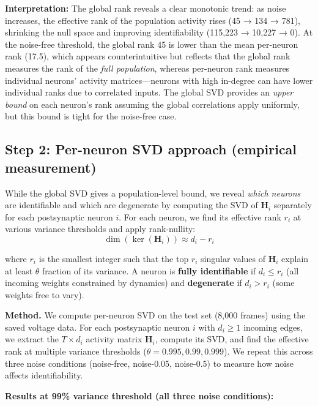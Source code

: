 \documentclass[11pt,a4paper]{article}
\begin{document}
\noindent\textbf{Interpretation:} The global rank reveals a clear monotonic trend: as noise increases, the effective rank of the population activity rises (45 → 134 → 781), shrinking the null space and improving identifiability (115,223 → 10,227 → 0). At the noise-free threshold, the global rank 45 is lower than the mean per-neuron rank (17.5), which appears counterintuitive but reflects that the global rank measures the rank of the \emph{full population}, whereas per-neuron rank measures individual neurons' activity matrices---neurons with high in-degree can have lower individual ranks due to correlated inputs. The global SVD provides an \emph{upper bound} on each neuron's rank assuming the global correlations apply uniformly, but this bound is tight for the noise-free case.

\subsection{Step 2: Per-neuron SVD approach (empirical measurement)}

While the global SVD gives a population-level bound, we reveal \emph{which neurons} are identifiable and which are degenerate by computing the SVD of $\mathbf{H}_i$ separately for each postsynaptic neuron $i$. For each neuron, we find its effective rank $r_i$ at various variance thresholds and apply rank-nullity:
\begin{equation}
\dim(\ker(\mathbf{H}_i)) \approx d_i - r_i
\end{equation}

where $r_i$ is the smallest integer such that the top $r_i$ singular values of $\mathbf{H}_i$ explain at least $\theta$ fraction of its variance. A neuron is \textbf{fully identifiable} if $d_i \leq r_i$ (all incoming weights constrained by dynamics) and \textbf{degenerate} if $d_i > r_i$ (some weights free to vary).

\noindent\textbf{Method.} We compute per-neuron SVD on the test set (8,000 frames) using the saved voltage data. For each postsynaptic neuron $i$ with $d_i \geq 1$ incoming edges, we extract the $T \times d_i$ activity matrix $\mathbf{H}_i$, compute its SVD, and find the effective rank at multiple variance thresholds ($\theta = 0.995, 0.99, 0.999$). We repeat this across three noise conditions (noise-free, noise-0.05, noise-0.5) to measure how noise affects identifiability.

\noindent\textbf{Results at 99\% variance threshold (all three noise conditions):}
\end{document}
